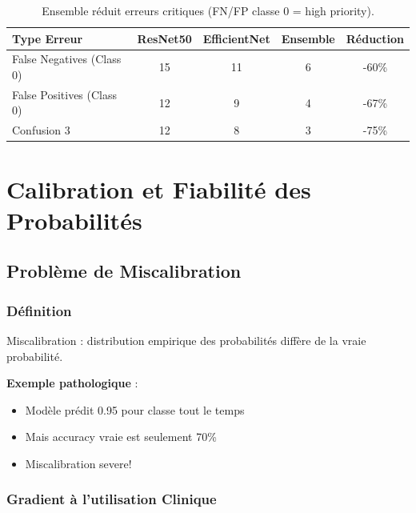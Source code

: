\documentclass[12pt,a4paper,oneside]{report}
\begin{document}
\begin{table}[H]
\centering
\begin{tabular}{|l|c|c|c|c|}
\hline
\textbf{Type Erreur} & \textbf{ResNet50} & \textbf{EfficientNet} & 
\textbf{Ensemble} & \textbf{Réduction} \\
\hline
False Negatives (Class 0) & 15 & 11 & 6 & -60\% \\
False Positives (Class 0) & 12 & 9 & 4 & -67\% \\
Confusion 3\leftrightarrow4 & 12 & 8 & 3 & -75\% \\
\hline
\end{tabular}
\caption{Ensemble réduit erreurs critiques (FN/FP classe 0 = 
high priority).}
\label{tab:error_reduction}
\end{table}

\newpage


\chapter{Calibration et Fiabilité des Probabilités}

\section{Problème de Miscalibration}

\subsection{Définition}

Miscalibration : distribution empirique des probabilités diffère 
de la vraie probabilité.

\textbf{Exemple pathologique} :
\begin{itemize}
    \item Modèle prédit 0.95 pour classe tout le temps
    \item Mais accuracy vraie est seulement 70\%
    \item Miscalibration severe!
\end{itemize}

\subsection{Gradient à l'utilisation Clinique}
\end{document}
